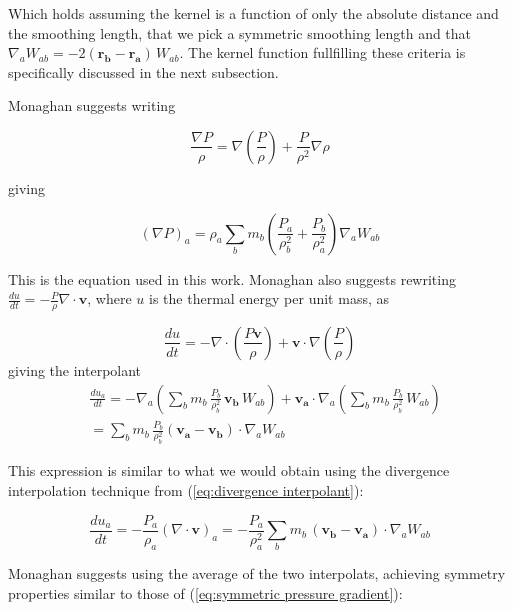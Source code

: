\documentclass[../main.tex]{subfiles}
\begin{document}
Which holds assuming the kernel is a function of only the absolute distance and the smoothing length, that we pick a
symmetric smoothing length and that $\nabla_a W_{ab} = -2(\bm{r_b} - \bm{r_a}) \, W_{ab}$. The
kernel function fullfilling these criteria is specifically discussed in the next subsection.

Monaghan \autocite{sph} suggests writing

\begin{equation}
    \frac{\nabla P}{\rho} = \nabla (\frac{P}{\rho}) + \frac{P}{\rho^2} \nabla \rho
\end{equation}

giving

\begin{equation} \label{eq:symmetric pressure gradient}
    (\nabla P)_a = \rho_a \sum_b m_b (\frac{P_a}{\rho_b^2} + \frac{P_b}{\rho_a^2}) \nabla_a W_{ab}
\end{equation}

This is the equation used in this work. Monaghan also suggests rewriting $\frac{du}{dt} = -
\frac{P}{\rho} \nabla \cdot \bm{v}$, where $u$ is the thermal energy per unit mass, as

\begin{equation} \label{eq:2.19}
    \frac{du}{dt}
    = - \nabla \cdot (\frac{P\bm{v}}{\rho}) + \bm{v} \cdot \nabla (\frac{P}{\rho})
\end{equation}
giving the interpolant
\begin{equation}
\begin{aligned}
  & \frac{du_a}{dt}
  = - \nabla_a (\sum_b m_b \, \frac{P_b}{\rho_b^2} \, \bm{v_b} \, W_{ab})
  + \bm{v_a} \cdot \nabla_a (\sum_b m_b \, \frac{P_b}{\rho_b^2} \, W_{ab}) \\
  & = \sum_b m_b \, \frac{P_b}{\rho_b^2} (\bm{v_a} - \bm{v_b}) \cdot \nabla_a W_{ab}
\end{aligned}
\end{equation}

This expression is similar to what we would obtain using the divergence interpolation technique from
(\ref{eq:divergence interpolant}):

\begin{equation}
    \frac{du_a}{dt}
    = - \frac{P_a}{\rho_a} (\nabla \cdot \bm{v})_a
    = - \frac{P_a}{\rho_a^2} \sum_b m_b \, (\bm{v_b} - \bm{v_a}) \cdot \nabla_a W_{ab}
\end{equation}

Monaghan suggests using the average of the two interpolats, achieving symmetry properties similar to
those of (\ref{eq:symmetric pressure gradient}):
\end{document}
